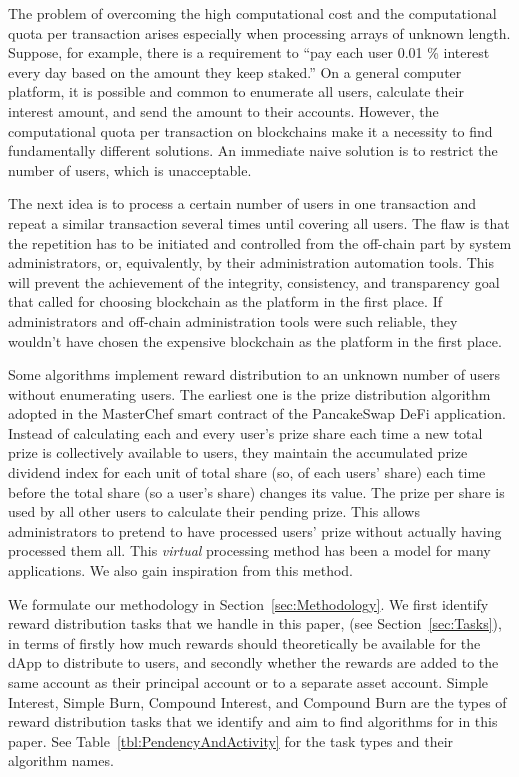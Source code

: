 \documentclass{article}
\begin{document}
The problem of overcoming the high computational cost and the computational quota 
per transaction arises especially when processing arrays of unknown length.
Suppose, for example, there is a requirement to “pay each user 0.01 \% interest 
every day based on the amount they keep staked.” 
On a general computer platform, it is possible and common to enumerate all users, 
calculate their interest amount, and send the amount to their accounts. However, 
the computational quota per transaction on blockchains make it a necessity to find 
fundamentally different solutions.
An immediate naive solution is to restrict the number of users, which is unacceptable.

The next idea is to process a certain number of users in one transaction and repeat 
a similar transaction several times until covering all users. 
The flaw is that the repetition has to be initiated and controlled 
from the off-chain part by system administrators, or, equivalently, by 
their administration automation tools.
This will prevent the achievement of the integrity, consistency, and transparency goal 
that called for choosing blockchain as the platform in the first place. 
If administrators and off-chain administration tools 
were such reliable, they wouldn't have chosen the expensive blockchain as the platform 
in the first place.

Some algorithms implement reward distribution to an unknown number of users 
without enumerating users. The earliest one is the 
prize distribution algorithm adopted in the MasterChef smart contract of the PancakeSwap 
DeFi application.
Instead of calculating each and every user’s prize share each time a new total 
prize is collectively available to users, 
they maintain the accumulated prize dividend index for each unit 
of total share (so, of each users' share) each time before the total share 
(so a user's share) changes its value.
The prize per share is used by all other users to calculate their 
pending prize.
This allows administrators to pretend to have processed users’ prize without 
actually having processed them all.
This \textit{virtual} processing method has been a model for many applications. 
We also gain inspiration from this method.

We formulate our methodology in Section~\ref{sec:Methodology}.
We first identify reward distribution tasks that we handle in this paper, 
(see Section~\ref{sec:Tasks}),
in terms of firstly how much rewards should theoretically be available for the dApp 
to distribute to users, 
and secondly whether the rewards are added to the same account as their principal account 
or to a separate asset account.
Simple Interest, Simple Burn, Compound Interest, and Compound Burn are the types of 
reward distribution tasks that we identify and aim to find algorithms for in this paper.
See Table~\ref{tbl:PendencyAndActivity} for the task types and their algorithm names.
\end{document}
